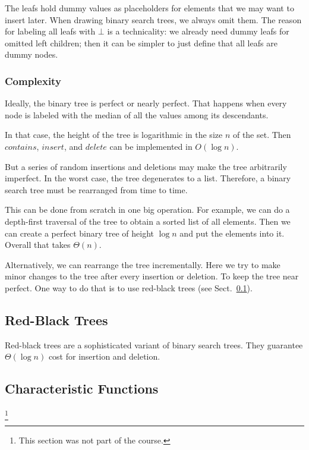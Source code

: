The leafs hold dummy values as placeholders for elements that we may want to insert later.
When drawing binary search trees, we always omit them.
The reason for labeling all leafs with $\bot$ is a technicality: we already need dummy leafs for omitted left children; then it can be simpler to just define that all leafs are dummy nodes.

\subsubsection{Complexity}

Ideally, the binary tree is perfect or nearly perfect.
That happens when every node is labeled with the median of all the values among its descendants.

In that case, the height of the tree is logarithmic in the size $n$ of the set.
Then $contains$, $insert$, and $delete$ can be implemented in $O(\log n)$.
\medskip

But a series of random insertions and deletions may make the tree arbitrarily imperfect.
In the worst case, the tree degenerates to a list.
Therefore, a binary search tree must be rearranged from time to time.

This can be done from scratch in one big operation.
For example, we can do a depth-first traversal of the tree to obtain a sorted list of all elements.
Then we can create a perfect binary tree of height $\log n$ and put the elements into it.
Overall that takes $\Theta(n)$.

Alternatively, we can rearrange the tree incrementally.
Here we try to make minor changes to the tree after every insertion or deletion.
To keep the tree near perfect.
One way to do that is to use red-black trees (see Sect.~\ref{sec:ad:redblacktree}).

\subsection{Red-Black Trees}\label{sec:ad:redblacktree}

Red-black trees are a sophisticated variant of binary search trees.
They guarantee $\Theta(\log n)$ cost for insertion and deletion.

\subsection{Characteristic Functions}\label{sec:ad:charfun}

\footnote{This section was not part of the course.}

